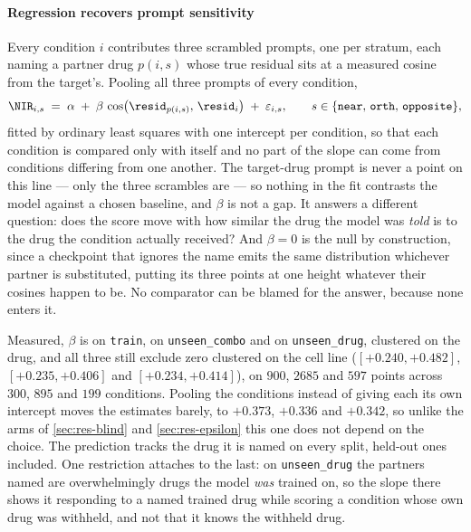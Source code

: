 \paragraph{Regression recovers prompt sensitivity} 

Every condition $i$ contributes three scrambled prompts, one per stratum,
each naming a partner drug $p(i,s)$ whose true residual sits at a measured cosine
from the target's. Pooling all three prompts of every condition,
\begin{equation}
 \NIR_{i,s} \;=\; \alpha \;+\; \beta\,
   \cos\!\big(\resid_{p(i,s)},\, \resid_{i}\big) \;+\; \varepsilon_{i,s},
 \qquad s \in \{\texttt{near},\, \texttt{orth},\, \texttt{opposite}\},
\end{equation}
fitted by ordinary least squares with one intercept per condition, so that each
condition is compared only with itself and no part of the slope can come from
conditions differing from one another. The target-drug prompt is never a point on
this line --- only
the three scrambles are --- so nothing in the fit contrasts the model against a
chosen baseline, and $\beta$ is not a gap. It answers a different question: does
the score move with how similar the drug the model was \emph{told} is to the drug
the condition actually received? And $\beta = 0$ is the null by construction, since
a checkpoint that ignores the name emits the same distribution whichever partner
is substituted, putting its three points at one height whatever their cosines
happen to be. No comparator can be blamed for the answer, because none enters it.

Measured, $\beta$ is  on \texttt{train},
 on \texttt{unseen\_combo} and
 on \texttt{unseen\_drug}, clustered on the drug, and
all three still exclude zero clustered on the cell line ($[+0.240, +0.482]$,
$[+0.235, +0.406]$ and $[+0.234, +0.414]$), on $900$, $\num{2685}$ and $597$
points across $300$, $895$ and $199$ conditions. Pooling the conditions instead
of giving each its own intercept moves the estimates barely, to $+0.373$, $+0.336$
and $+0.342$, so unlike the arms of \cref{sec:res-blind} and
\cref{sec:res-epsilon} this one does not depend on the choice. The prediction tracks the drug it is named on every split,
held-out ones included. One restriction attaches to the last: on
\texttt{unseen\_drug} the partners named are overwhelmingly drugs the model
\emph{was} trained on, so the slope there shows it responding to a named trained
drug while scoring a condition whose own drug was withheld, and not that it knows
the withheld drug.


